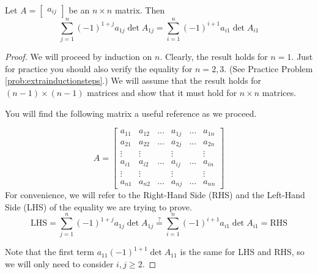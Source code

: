 \documentclass{ximera}
\begin{document}
\begin{theorem}\label{th:rowcolexpequivalence}
Let $A=\begin{bmatrix}a_{ij}\end{bmatrix}$ be an $n\times n$ matrix.  Then
$$\sum_{j=1}^n(-1)^{1+j}a_{1j}\det{A_{1j}}=\sum_{i=1}^n(-1)^{i+1}a_{i1}\det{A_{i1}}$$
\end{theorem}
\begin{proof}
We will proceed by induction on $n$.  Clearly, the result holds for $n=1$.  Just for practice you should also verify the equality for $n=2, 3$. (See Practice Problem \ref{prob:extrainductionsteps}.)  We will assume that the result holds for $(n-1)\times (n-1)$ matrices and show that it must hold for $n\times n$ matrices.

You will find the following matrix a useful reference as we proceed.

$$A=\begin{bmatrix}a_{11} & a_{12} & \dots &  a_{1j} &  \dots & a_{1n}  \\
    a_{21} & a_{22} & \dots &  a_{2j} &  \dots & a_{2n}  \\
   \vdots & \vdots &  & \vdots &   & \vdots  \\
  a_{i1} & a_{i2} & \ldots &  a_{ij} &  \ldots & a_{in}\\
  \vdots & \vdots &  & \vdots &   & \vdots  \\
   a_{n1} & a_{n2} & \dots &  a_{nj} &  \dots & a_{nn}\end{bmatrix}$$
   For convenience, we will refer to the Right-Hand Side (RHS) and the Left-Hand Side (LHS) of the equality we are trying to prove.
   $$\text{LHS}=\sum_{j=1}^n(-1)^{1+j}a_{1j}\det{A_{1j}}\overset{?}{=}\sum_{i=1}^n(-1)^{i+1}a_{i1}\det{A_{i1}}=\text{RHS}$$
   
   Note that the first term $a_{11}(-1)^{1+1}\det{A_{11}}$ is the same for LHS and RHS, so we will only need to consider $i,j\geq 2$.
   

\end{proof}
\end{document}
